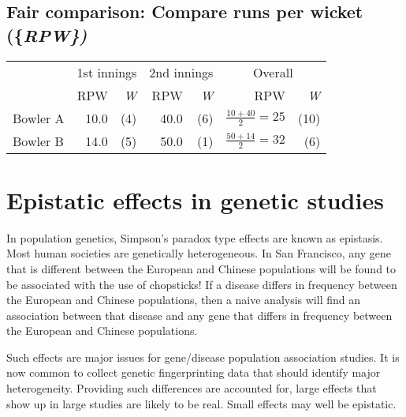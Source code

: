 \documentclass[
  10ptls,
  b5paper]{book}
\begin{document}
\subsection*{\texorpdfstring{Fair comparison: Compare runs per wicket (\{\em RPW\})}{Fair comparison: Compare runs per wicket (\{\})}}\label{fair-comparison-compare-runs-per-wicket}

\vspace*{-5pt}

\begin{center}
\begin{tabular}{lrr||rr||rr}
\hline
 & \multicolumn{2}{c}{1st innings} & \multicolumn{2}{c}{2nd innings} &
\multicolumn{2}{c}{Overall} \\
\cline{2-3} \cline{4-5} \cline{6-7}
         &  RPW & {\em W}   &  RPW & {\em W} &
           RPW & {\em W} \\[4pt]
Bowler A &  10.0 & (4) & 40.0 & (6)  &
$\frac{10+40}{2} = 25$ & (10)\\[4pt]
Bowler B & 14.0 & (5)  & 50.0 & (1) & $\frac{50+14}{2} = 32$  &  (6)\\[4pt]
\cline{2-3} \cline{4-5} \cline{6-7}
\end{tabular}
\end{center}

\section{Epistatic effects in genetic studies}\label{epistatic-effects-in-genetic-studies}

In population genetics, Simpson's paradox type effects are known as epistasis. Most human societies are genetically heterogeneous. In San Francisco, any gene that is different between the European and Chinese populations will be found to be associated with the use of chopsticks! If a disease differs in frequency between the European and Chinese populations, then a naive analysis will find an association between that disease and any gene that differs in frequency between the European and Chinese populations.

Such effects are major issues for gene/disease population association studies. It is now common to collect genetic fingerprinting data that should identify major heterogeneity. Providing such differences are accounted for, large effects that show up in large studies are likely to be real. Small effects may well be epistatic.
\end{document}
